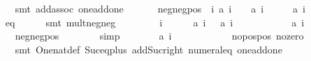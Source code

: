 \begin{isabellebody}
\ \ \ \ \ \ \isamarkupfalse%
\ {\isacharparenleft}smt\ add{\isachardot}assoc\ one{\isacharunderscore}add{\isacharunderscore}one{\isacharparenright}\isanewline
\ \ \isamarkupfalse%
\isanewline
\isanewline
\ \ \isamarkupfalse%
\ neg{\isacharunderscore}neg{\isacharunderscore}pos{\isacharcolon}\ {\isachardoublequoteopen}{\isasymforall}\ i{\isachardot}\ {\isacharquery}a\ i\ {\isacharless}\ {}\ {\isasymand}\ {\isacharquery}a\ {\isacharparenleft}i\ {\isacharplus}\ {}{\isacharparenright}\ {\isacharless}\ {}\ {\isasymlongrightarrow}\ {\isacharquery}a\ {\isacharparenleft}i\ {\isacharplus}\ {}{\isacharparenright}\ {\isachargreater}\ {}{\isachardoublequoteclose}\isanewline
\ \ \ \ \isamarkupfalse%
\ eq\isanewline
\ \ \ \ \isamarkupfalse%
\ {\isacharparenleft}smt\ mult{\isacharunderscore}neg{\isacharunderscore}neg{\isacharparenright}\isanewline
\isanewline
\ \ \isacommand{{\isacharbraceleft}}\isamarkupfalse%
\isanewline
\ \ \ \ \isamarkupfalse%
\ i\isanewline
\ \ \ \ \isamarkupfalse%
\ {\isachardoublequoteopen}{\isacharquery}a\ i\ {\isacharless}\ {}{\isachardoublequoteclose}\ {\isachardoublequoteopen}{\isacharquery}a\ {\isacharparenleft}i\ {\isacharplus}\ {}{\isacharparenright}\ {\isacharless}\ {}{\isachardoublequoteclose}\isanewline
\ \ \ \ \isamarkupfalse%
\ \isamarkupfalse%
\ {\isachardoublequoteopen}{\isacharquery}a\ {\isacharparenleft}i\ {\isacharplus}\ {}{\isacharparenright}\ {\isachargreater}\ {}{\isachardoublequoteclose}\isanewline
\ \ \ \ \ \ \isamarkupfalse%
\ neg{\isacharunderscore}neg{\isacharunderscore}pos\isanewline
\ \ \ \ \ \ \isamarkupfalse%
\ simp\isanewline
\ \ \ \ \isamarkupfalse%
\ \isamarkupfalse%
\ {\isachardoublequoteopen}{\isacharquery}a\ {\isacharparenleft}i\ {\isacharplus}\ {}{\isacharparenright}\ {\isacharless}\ {}{\isachardoublequoteclose}\isanewline
\ \ \ \ \ \ \isamarkupfalse%
\ no{\isacharunderscore}pos{\isacharunderscore}pos\ no{\isacharunderscore}zero\isanewline
\ \ \ \ \ \ \isamarkupfalse%
\ {\isacharparenleft}smt\ One{\isacharunderscore}nat{\isacharunderscore}def\ Suc{\isacharunderscore}eq{\isacharunderscore}plus{}\ add{\isacharunderscore}Suc{\isacharunderscore}right\ numeral{\isacharunderscore}{}{\isacharunderscore}eq{\isacharunderscore}{}\ one{\isacharunderscore}add{\isacharunderscore}one{\isacharparenright}\isanewline

\end{isabellebody}
